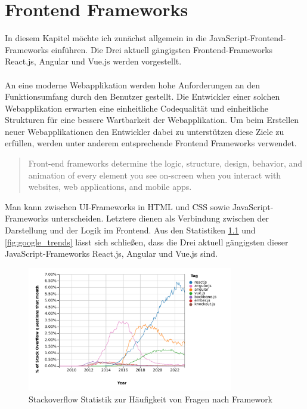 %

\chapter{Frontend Frameworks}

In diesem Kapitel möchte ich zunächst allgemein in die JavaScript-Frontend-Frameworks einführen.
Die Drei aktuell gängigsten Frontend-Frameworks React.js, Angular und Vue.js werden vorgestellt.
\\
\\
An eine moderne Webapplikation werden hohe Anforderungen an den Funktionsumfang durch den Benutzer gestellt.
Die Entwickler einer solchen Webapplikation erwarten eine einheitliche Codequalität und einheitliche Strukturen
für eine bessere Wartbarkeit der Webapplikation.
Um beim Erstellen neuer Webapplikationen den Entwickler dabei zu unterstützen diese Ziele zu erfüllen,
werden unter anderem entsprechende Frontend Frameworks verwendet.
\begin{quote}
    Front-end frameworks determine the logic, structure, design, behavior,
    and animation of every element you see on-screen when you interact with websites,
    web applications, and mobile apps. \cite{sigdestad22}
\end{quote}
Man kann zwischen UI-Frameworks in HTML und CSS sowie JavaScript-Frameworks unterscheiden.
Letztere dienen als Verbindung zwischen der Darstellung und der Logik im Frontend.
Aus den Statistiken \ref{fig:stackoverflow_stat} und \ref{fig:google_trends} lässt sich schließen,
dass die Drei aktuell gängigsten dieser JavaScript-Frameworks React.js, Angular und Vue.js sind.



\begin{figure}[!htb]
    \centering
    \includegraphics[width=0.8\textwidth]{img/js_frameworks_statistic_stackoverflow}
    \caption{Stackoverflow Statistik zur Häufigkeit von Fragen nach Framework \cite{stackoverflowStats}}
    \label{fig:stackoverflow_stat}
\end{figure}

